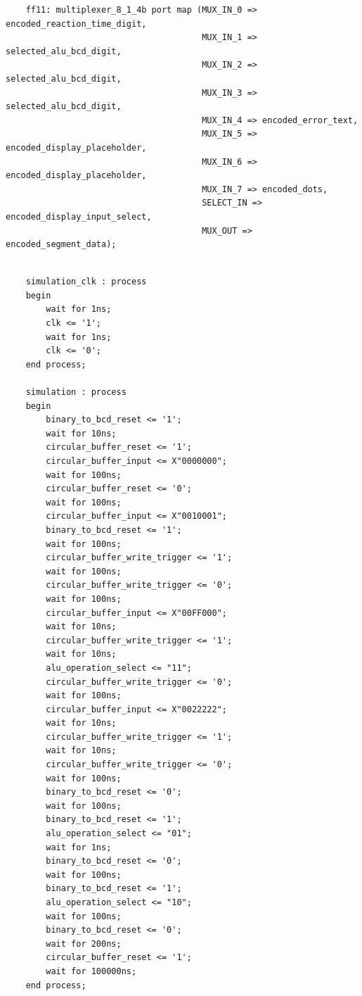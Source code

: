 \documentclass[11pt]{article}
\newenvironment{code}{\captionsetup{type=listing}}{}
\begin{document}
\vspace*{1cm}

\begin{code}
  \begin{verbatim}
    ff11: multiplexer_8_1_4b port map (MUX_IN_0 => encoded_reaction_time_digit,
                                       MUX_IN_1 => selected_alu_bcd_digit,
                                       MUX_IN_2 => selected_alu_bcd_digit,
                                       MUX_IN_3 => selected_alu_bcd_digit,
                                       MUX_IN_4 => encoded_error_text,
                                       MUX_IN_5 => encoded_display_placeholder,
                                       MUX_IN_6 => encoded_display_placeholder,
                                       MUX_IN_7 => encoded_dots,
                                       SELECT_IN => encoded_display_input_select,
                                       MUX_OUT => encoded_segment_data);
  \end{verbatim}
  \captionsetup{belowskip=0pt}
  \label{code:output_select_mux_instantiation}
\end{code}

\vspace*{1cm}
\begin{code}
  \begin{verbatim}

    simulation_clk : process
    begin
        wait for 1ns;
        clk <= '1';
        wait for 1ns;
        clk <= '0';
    end process;

    simulation : process
    begin
        binary_to_bcd_reset <= '1';
        wait for 10ns;
        circular_buffer_reset <= '1';
        circular_buffer_input <= X"0000000";
        wait for 100ns;
        circular_buffer_reset <= '0';
        wait for 100ns;
        circular_buffer_input <= X"0010001";
        binary_to_bcd_reset <= '1';
        wait for 100ns;
        circular_buffer_write_trigger <= '1';
        wait for 100ns;
        circular_buffer_write_trigger <= '0';
        wait for 100ns;
        circular_buffer_input <= X"00FF000";
        wait for 10ns;
        circular_buffer_write_trigger <= '1';
        wait for 10ns;
        alu_operation_select <= "11";
        circular_buffer_write_trigger <= '0';
        wait for 100ns;
        circular_buffer_input <= X"0022222";
        wait for 10ns;
        circular_buffer_write_trigger <= '1';
        wait for 10ns;
        circular_buffer_write_trigger <= '0';
        wait for 100ns;
        binary_to_bcd_reset <= '0';
        wait for 100ns;
        binary_to_bcd_reset <= '1';
        alu_operation_select <= "01";
        wait for 1ns;
        binary_to_bcd_reset <= '0';
        wait for 100ns;
        binary_to_bcd_reset <= '1';
        alu_operation_select <= "10";
        wait for 100ns;
        binary_to_bcd_reset <= '0';
        wait for 200ns;
        circular_buffer_reset <= '1';
        wait for 100000ns;
    end process;
        

  \end{verbatim}
  \captionsetup{belowskip=0pt}
  \label{code:alu_testbench}
\end{code}
\end{document}
